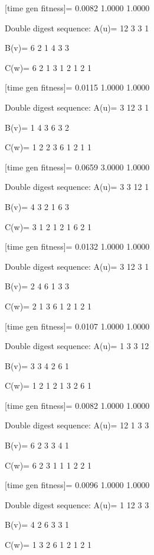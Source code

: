 [time gen fitness]=
    0.0082    1.0000    1.0000

Double digest sequence:
A(u)=
    12     3     3     1

B(v)=
     6     2     1     4     3     3

C(w)=
     6     2     1     3     1     2     1     2     1

[time gen fitness]=
    0.0115    1.0000    1.0000

Double digest sequence:
A(u)=
     3    12     3     1

B(v)=
     1     4     3     6     3     2

C(w)=
     1     2     2     3     6     1     2     1     1

[time gen fitness]=
    0.0659    3.0000    1.0000

Double digest sequence:
A(u)=
     3     3    12     1

B(v)=
     4     3     2     1     6     3

C(w)=
     3     1     2     1     2     1     6     2     1

[time gen fitness]=
    0.0132    1.0000    1.0000

Double digest sequence:
A(u)=
     3    12     3     1

B(v)=
     2     4     6     1     3     3

C(w)=
     2     1     3     6     1     2     1     2     1

[time gen fitness]=
    0.0107    1.0000    1.0000

Double digest sequence:
A(u)=
     1     3     3    12

B(v)=
     3     3     4     2     6     1

C(w)=
     1     2     1     2     1     3     2     6     1

[time gen fitness]=
    0.0082    1.0000    1.0000

Double digest sequence:
A(u)=
    12     1     3     3

B(v)=
     6     2     3     3     4     1

C(w)=
     6     2     3     1     1     1     2     2     1

[time gen fitness]=
    0.0096    1.0000    1.0000

Double digest sequence:
A(u)=
     1    12     3     3

B(v)=
     4     2     6     3     3     1

C(w)=
     1     3     2     6     1     2     1     2     1


